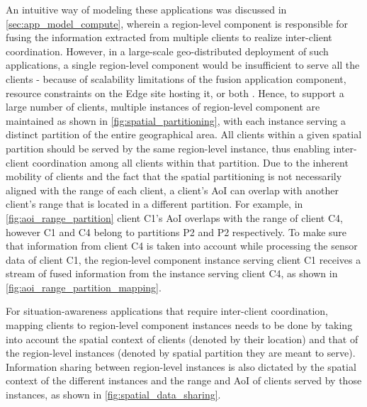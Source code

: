 An intuitive way of modeling these applications was discussed in \cref{sec:app_model_compute}, wherein a region-level component is responsible for fusing the information extracted from multiple clients to realize inter-client coordination. However, in a large-scale geo-distributed deployment of such applications, a single region-level component would be insufficient to serve all the clients - because of scalability limitations of the fusion application component, resource constraints on the Edge site hosting it, or both \cite{talkycars}. Hence, to support a large number of clients, multiple instances of region-level component are maintained as shown in \cref{fig:spatial_partitioning}, with each instance serving a distinct partition of the entire geographical area. All clients within a given spatial partition should be served by the same region-level instance, thus enabling inter-client coordination among all clients within that partition. Due to the inherent mobility of clients and the fact that the spatial partitioning is not necessarily aligned with the range of each client, a client's AoI can overlap with another client's range that is located in a different partition. For example, in \cref{fig:aoi_range_partition} client C1's AoI overlaps with the range of client C4, however C1 and C4 belong to partitions P2 and P2 respectively. To make sure that information from client C4 is taken into account while processing the sensor data of client C1, the region-level component instance serving client C1 receives a stream of fused information from the instance serving client C4, as shown in \cref{fig:aoi_range_partition_mapping}. 

\par For situation-awareness applications that require inter-client coordination, mapping clients to region-level component instances needs to be done by taking into account the spatial context of clients (denoted by their location) and that of the region-level instances (denoted by spatial partition they are meant to serve). Information sharing between region-level instances is also dictated by the spatial context of the different instances and the range and AoI of clients served by those instances, as shown in \cref{fig:spatial_data_sharing}. 

